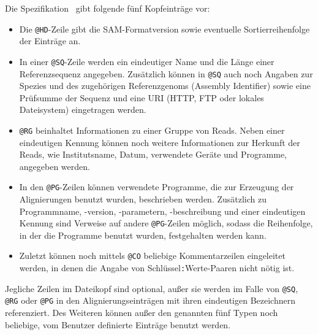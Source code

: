 Die Spezifikation~\citep{samspec} gibt folgende fünf Kopfeinträge vor:
\begin{itemize}
    \item Die \texttt{@HD}-Zeile gibt die SAM-Formatversion sowie eventuelle Sortierreihenfolge der Einträge an.
    \item In einer \texttt{@SQ}-Zeile werden ein eindeutiger Name und die Länge einer Referenzsequenz angegeben.
    Zusätzlich können in \texttt{@SQ} auch noch Angaben zur Spezies und des zugehörigen Referenzgenoms (Assembly Identifier) sowie eine Prüfsumme der Sequenz und eine URI (HTTP, FTP oder lokales Dateisystem) eingetragen werden.
    \item \texttt{@RG} beinhaltet Informationen zu einer Gruppe von Reads.
    Neben einer eindeutigen Kennung können noch weitere Informationen zur Herkunft der Reads, wie Institutsname, Datum, verwendete Geräte und Programme, angegeben werden.
    \item In den \texttt{@PG}-Zeilen können verwendete Programme, die zur Erzeugung der Alignierungen benutzt wurden, beschrieben werden.
    Zusätzlich zu Programmname, -version, -parametern, -beschreibung und einer eindeutigen Kennung sind Verweise auf andere \texttt{@PG}-Zeilen möglich, sodass die Reihenfolge, in der die Programme benutzt wurden, festgehalten werden kann.
    \item Zuletzt können noch mittels \texttt{@CO} beliebige Kommentarzeilen eingeleitet werden, in denen die Angabe von Schlüssel\texttt{:}Werte-Paaren nicht nötig ist.
\end{itemize}
Jegliche Zeilen im Dateikopf sind optional, außer sie werden im Falle von \texttt{@SQ}, \texttt{@RG} oder \texttt{@PG} in den Alignierungseinträgen mit ihren eindeutigen Bezeichnern referenziert.
Des Weiteren können außer den genannten fünf Typen noch beliebige, vom Benutzer definierte Einträge benutzt werden.

